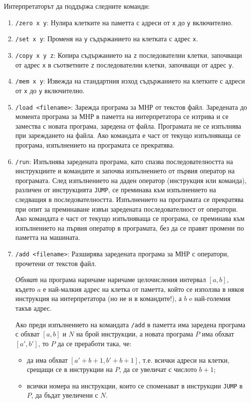 \documentclass[12pt,a4paper]{article}
\newcommand{\code}[1]{\texttt{#1}}
\begin{document}
{Интерпретаторът да поддържа следните команди:

\begin{enumerate}
    \item \code{/zero x y}: Нулира клетките на паметта с адреси от \code{x} до \code{y} включително.
    \item \code{/set x y}: Променя на \code{y} съдържанието на клетката с адрес \code{x}.
    \item \code{/copy x y z}: Копира съдържанието на \code{z} последователни клетки, започващи от адрес \code{x} в съответните \code{z} последователни клетки, започващи от адрес \code{y}.
    \item \code{/mem x y}: Извежда на стандартния изход съдържанието на клетките с адреси от \code{x} до \code{y} включително.
    \item \code{/load <filename>}: Зарежда програма за МНР от текстов файл. Заредената до момента програма за МНР в паметта на интерпретатора се изтрива и се замества с новата програма, заредена от файла. Програмата не се изпълнява при зареждането на файла. Ако командата е част от текущо изпълняваща се програма, изпълнението на програмата се прекратява.
    \item \code{/run}: Изпълнява заредената програма, като спазва последователността на инструкциите и командите и започва изпълнението от първия оператор на програмата. След изпълнението на даден оператор (инструкция или команда), различен от инструкцията \code{JUMP}, се преминава към изпълнението на следващия в последователността. Изпълнението на програмата се прекратява при опит за преминаване извън заредената последователност от оператори. Ако командата е част от текущо изпълняваща се програма, се преминава към изпълнението на първия оператор в програмата, без да се правят промени по паметта на машината.
    \item \code{/add <filename>}: Разширява заредената програма за МНР с оператори, прочетени от текстов файл.

    \emph{Обхват} на програма наричаме наричаме целочисления интервал $[a,b]$, където $a$ е най-малкия адрес на клетка от паметта, който се използва в някоя инструкция на интерпретатора (но не и в командите!), а $b$ e най-големия такъв адрес.

    Ако преди изпълнението на командата \code{/add} в паметта има заредена програма с обхват $[a,b]$ и $N$ на брой инструкции, а новата програма $P$ има обхват $[a',b']$, то $P$ да се преработи така, че:
    \begin{itemize}
    \item да има обхват $[a'+b+1,b'+b+1]$, т.е. всички адреси на клетки, срещащи се в инструкции на $P$, да се увеличат с числото $b+1$;
    \item всички номера на инструкции, които се споменават в инструкции \code{JUMP} в $P$, да бъдат увеличени с $N$.
    \end{itemize}


\end{enumerate}}
\end{document}
